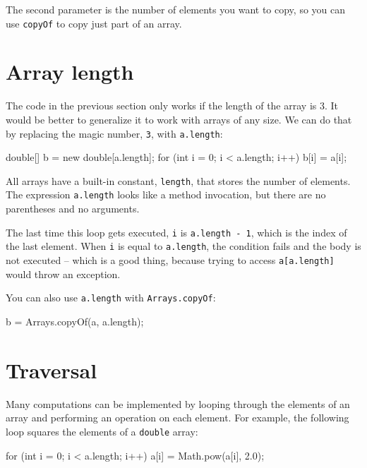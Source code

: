 \documentclass[12pt]{book}
\theoremstyle{exercise}
\newcommand{\java}[1]{\verb"#1"}
\begin{document}
The second parameter is the number of elements you want to copy, so you can use \java{copyOf} to copy just part of an array.


\section{Array length}


The code in the previous section only works if the length of the array is 3.
It would be better to generalize it to work with arrays of any size.
We can do that by replacing the magic number, \java{3}, with \java{a.length}:

\begin{code}
    double[] b = new double[a.length];
    for (int i = 0; i < a.length; i++) {
        b[i] = a[i];
    }
\end{code}

All arrays have a built-in constant, \java{length}, that stores the number of elements.
The expression \java{a.length} looks like a method invocation, but there are no parentheses and no arguments.

The last time this loop gets executed, \java{i} is \java{a.length - 1}, which is the index of the last element.
When \java{i} is equal to \java{a.length}, the condition fails and the body is not executed -- which is a good thing, because trying to access \java{a[a.length]} would throw an exception.

You can also use \java{a.length} with \java{Arrays.copyOf}:

\begin{code}
    b = Arrays.copyOf(a, a.length);
\end{code}


\section{Traversal}
\label{traversal}


Many computations can be implemented by looping through the elements of an array and performing an operation on each element.
For example, the following loop squares the elements of a \java{double} array:

\begin{code}
    for (int i = 0; i < a.length; i++) {
        a[i] = Math.pow(a[i], 2.0);
    }
\end{code}
\end{document}
